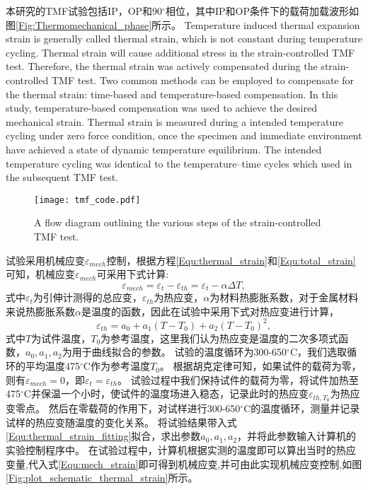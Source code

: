 本研究的TMF试验包括IP，OP和90$^\circ$相位，其中IP和OP条件下的载荷加载波形如图\ref{Fig:Thermomechanical_phase}所示。
Temperature induced thermal expansion strain is generally called thermal strain, which is not constant during temperature cycling. Thermal strain will cause additional stress in the strain-controlled TMF test. Therefore, the thermal strain was actively compensated during the strain-controlled TMF test. Two common methods can be employed to compensate for the thermal strain: time-based and temperature-based compensation. In this study, temperature-based compensation was used to achieve the desired mechanical strain. Thermal strain is measured during a intended temperature cycling under zero force condition, once the specimen and immediate environment have achieved a state of dynamic temperature equilibrium. The intended temperature cycling was identical to the temperature–time cycles which used in the subsequent TMF test.

\begin{figure}[!htp]
\centering
\texttt{[image: tmf\_code.pdf]}
\caption{A flow diagram outlining the various steps of the strain-controlled TMF test.}
\label{Fig:tmf_code}
\end{figure}

试验采用机械应变$\varepsilon_{mech}$控制，根据方程\ref{Equ:thermal_strain}和\ref{Equ:total_strain}可知，机械应变$\varepsilon_{mech}$可采用下式计算:
\begin{equation}
\varepsilon_{mech}=\varepsilon_{t}-\varepsilon_{th}=\varepsilon_{t}-\alpha\Delta T,
\label{Equ:mech_strain}
\end{equation}
式中$\varepsilon_{t}$为引伸计测得的总应变，$\varepsilon_{th}$为热应变，$\alpha$为材料热膨胀系数，对于金属材料来说热膨胀系数$\alpha$是温度的函数，因此在试验中采用下式对热应变进行计算，
\begin{equation}
\varepsilon_{th}=a_0+a_1(T-T_0)+a_2(T-T_0)^2,
\label{Equ:thermal_strain_fitting}
\end{equation}
式中$T$为试件温度，$T_0$为参考温度，这里我们认为热应变是温度的二次多项式函数，$a_0,a_1,a_2$为用于曲线拟合的参数。
试验的温度循环为300-650$^\circ$C，我们选取循环的平均温度475$^\circ$C作为参考温度$T_0$。
根据胡克定律可知，如果试件的载荷为零，则有$\varepsilon_{mech}=0$，即$\varepsilon_{t}=\varepsilon_{th}$。
试验过程中我们保持试件的载荷为零，将试件加热至475$^\circ$C并保温一个小时，使试件的温度场进入稳态，记录此时的热应变$\varepsilon_{th,T_0}$为热应变零点。
然后在零载荷的作用下，对试样进行300-650$^\circ$C的温度循环，测量并记录试样的热应变随温度的变化关系。
将试验结果带入式\ref{Equ:thermal_strain_fitting}拟合，求出参数$a_0,a_1,a_2$，并将此参数输入计算机的实验控制程序中。
在试验过程中，计算机根据实测的温度即可以算出当时的热应变量,代入式\ref{Equ:mech_strain}即可得到机械应变,并可由此实现机械应变控制,如图\ref{Fig:plot_schematic_thermal_strain}所示。











